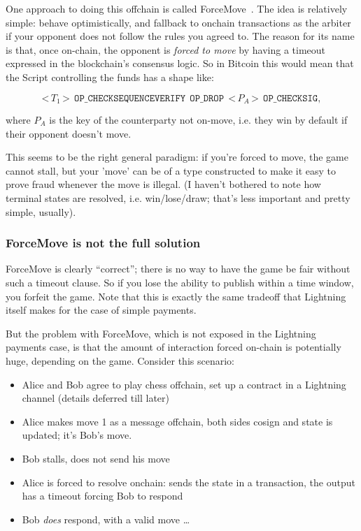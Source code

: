 \documentclass[11pt]{article}
\begin{document}
One approach to doing this offchain is called ForceMove~\cite{forcemove}. The idea is relatively simple: behave optimistically, and fallback to onchain transactions as the arbiter if your opponent does not follow the rules you agreed to. The reason for its name is that, once on-chain, the opponent is \emph{forced to move} by having a timeout expressed in the blockchain's consensus logic. So in Bitcoin this would mean that the Script controlling the funds has a shape like: 

\[
\texttt{<}\,T_1\,\texttt{>}\ \ \texttt{OP\_CHECKSEQUENCEVERIFY}\ \ \texttt{OP\_DROP}\ \ \texttt{<}\,P_A\,\texttt{>}\ \ \texttt{OP\_CHECKSIG},
\]

where $P_A$ is the key of the counterparty not on-move, i.e. they win by default if their opponent doesn't move.

This seems to be the right general paradigm: if you're forced to move, the game cannot stall, but your 'move' can be of a type constructed to make it easy to prove fraud whenever the move is illegal. (I haven't bothered to note how terminal states are resolved, i.e. win/lose/draw; that's less important and pretty simple, usually).

\subsubsection{ForceMove is not the full solution}

ForceMove is clearly ``correct''; there is no way to have the game be fair without such a timeout clause. So if you lose the ability to publish within a time window, you forfeit the game. Note that this is exactly the same tradeoff that Lightning itself makes for the case of simple payments.

But the problem with ForceMove, which is not exposed in the Lightning payments case, is that the amount of interaction forced on-chain is potentially huge, depending on the game. Consider this scenario:

\begin{itemize}
\item Alice and Bob agree to play chess offchain, set up a contract in a Lightning channel (details deferred till later)
\item Alice makes move 1 as a message offchain, both sides cosign and state is updated; it's Bob's move.
\item Bob stalls, does not send his move
\item Alice is forced to resolve onchain: sends the state in a transaction, the output has a timeout forcing Bob to respond
\item Bob \emph{does} respond, with a valid move \ldots
\end{itemize}
\end{document}
